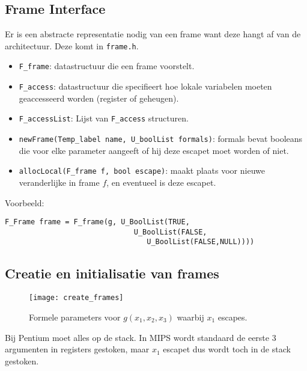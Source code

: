 \subsection{Frame Interface}
Er is een abstracte representatie nodig van een frame want deze hangt af van de architectuur. Deze komt in \texttt{frame.h}.

\begin{itemize}
	\item \texttt{F\_frame}: datastructuur die een frame voorstelt. 
	\item \texttt{F\_access}: datastructuur die specifieert hoe lokale variabelen moeten geaccesseerd worden (register of geheugen).
	\item \texttt{F\_accessList}: Lijst van \texttt{F\_access} structuren.
	\item \texttt{newFrame(Temp\_label name, U\_boolList formals)}: formals bevat booleans die voor elke parameter aangeeft of hij deze escapet moet worden of niet.
	\item \texttt{allocLocal(F\_frame f, bool escape)}: maakt plaats voor nieuwe veranderlijke in frame $f$, en eventueel is deze escapet.
\end{itemize}

Voorbeeld:
\begin{lstlisting}
F_Frame frame = F_frame(g, U_BoolList(TRUE,
                              U_BoolList(FALSE,
                                 U_BoolList(FALSE,NULL))))
\end{lstlisting}
 
\subsection{Creatie en initialisatie van frames}
\begin{figure}
	\texttt{[image: create\_frames]}
	\caption{Formele parameters voor $g(x_1, x_2, x_3)$ waarbij $x_1$ escapes.}
	\label{fig:create_frames}
\end{figure}

Bij Pentium moet alles op de stack. In MIPS wordt standaard de eerste 3 argumenten in registers gestoken, maar $x_1$ escapet dus wordt toch in de stack gestoken. 
 
